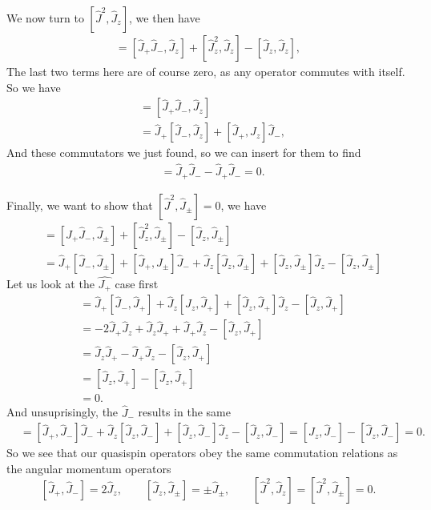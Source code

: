 \documentclass[a4paper, 11pt, notitlepage, english]{article}
\newcommand{\op}[1]{\hat{#1}}
\begin{document}
We now turn to $[\op{J}^2, \op{J}_z]$, we then have
\begin{align*}
[\op{J}^2, \op{J}_z] = [\op{J}_+\op{J}_-, \op{J}_z] + [\op{J}_z^2, \op{J}_z] - [\op{J}_z, \op{J}_z],
\end{align*}
The last two terms here are of course zero, as any operator commutes with itself. So we have
\begin{align*}
[\op{J}^2, \op{J}_z] &= [\op{J}_+\op{J}_-, \op{J}_z] \\
&= \op{J}_+[\op{J}_-, \op{J}_z] + [\op{J}_+, \op{J}_z]\op{J}_-,
\end{align*}
And these commutators we just found, so we can insert for them to find
\begin{align*}
[\op{J}^2, \op{J}_z] &= \op{J}_+\op{J}_- - \op{J}_+\op{J}_- = 0.
\end{align*}

Finally, we want to show that $[\op{J}^2, \op{J}_\pm]=0$, we have
\begin{align*}
[\op{J}^2, \op{J}_\pm] &= [\op{J}_+\op{J}_-, \op{J}_\pm] + [\op{J}_z^2, \op{J}_\pm] - [\op{J}_z, \op{J}_\pm] \\
&= \op{J}_+[\op{J}_-, \op{J}_\pm] + [\op{J}_+, \op{J}_\pm]\op{J}_-  + \op{J}_z[\op{J}_z, \op{J}_\pm] + [\op{J}_z, \op{J}_\pm]\op{J}_z - [\op{J}_z, \op{J}_\pm] 
\end{align*}
Let us look at the $\op{J_+}$ case first
\begin{align*}
[\op{J}^2, \op{J}_+] &= \op{J}_+[\op{J}_-, \op{J}_+] + \op{J}_z[\op{J}_z, \op{J}_+] + [\op{J}_z, \op{J}_+]\op{J}_z - [\op{J}_z, \op{J}_+] \\
&= -2\op{J}_+\op{J}_z + \op{J}_z\op{J}_+ + \op{J}_+\op{J}_z -  [\op{J}_z, \op{J}_+] \\
&= \op{J}_z\op{J}_+ - \op{J}_+\op{J}_z -  [\op{J}_z, \op{J}_+] \\
&= [\op{J}_z, \op{J}_+] -  [\op{J}_z, \op{J}_+] \\
&= 0.
\end{align*}
And unsuprisingly, the $\op{J}_-$ results in the same
\begin{align*}
[\op{J}^2, \op{J}_\pm] &= [\op{J}_+, \op{J}_-]\op{J}_-  + \op{J}_z[\op{J}_z, \op{J}_-] + [\op{J}_z, \op{J}_-]\op{J}_z - [\op{J}_z, \op{J}_-] =  [\op{J}_z, \op{J}_-] - [\op{J}_z, \op{J}_-] = 0.
\end{align*}
So we see that our quasispin operators obey the same commutation relations as the angular momentum operators
$$[\op{J}_+, \op{J}_-] = 2\op{J}_z, \qquad [\op{J}_z, \op{J}_\pm] = \pm\op{J}_\pm, \qquad [\op{J}^2, \op{J}_z] = [\op{J}^2, \op{J}_\pm] = 0.$$
\end{document}
